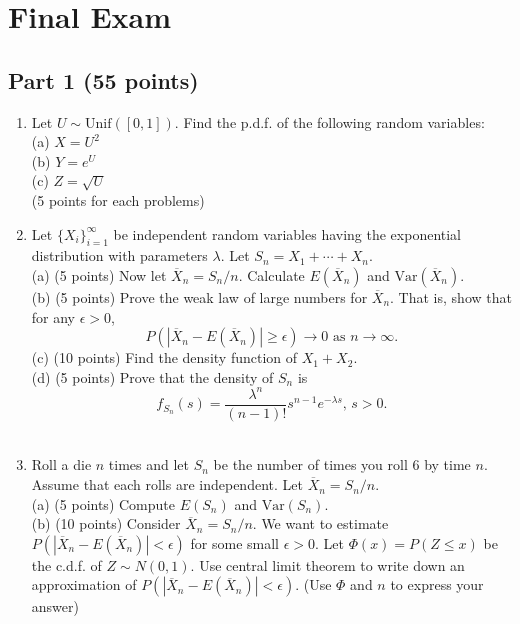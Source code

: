 \documentclass[14pt]{extarticle}
\begin{document}
\section*{Final Exam}
\subsection*{Part 1 (55 points)}
\begin{enumerate}
    \item Let $U\sim\text{Unif}([0,1])$. Find the p.d.f. of the following random variables:\\
    (a) $X=U^2$\\
    (b) $Y=e^U$\\
    (c) $Z=\sqrt{U}$\\
    (5 points for each problems)

    \item Let $\{X_i\}_{i=1}^\infty$ be independent random variables having the exponential distribution with parameters $\lambda$.
    Let $S_n=X_1+\cdots+X_n$.\\
    (a) (5 points) Now let $\overline{X}_n=S_n/n$. Calculate $E(\overline{X}_n)$ and $\text{Var}(\overline{X}_n)$.\\
    (b) (5 points) Prove the weak law of large numbers for $\overline{X}_n$. That is, show that for any $\epsilon>0$,
    \begin{equation*}
    P(|\overline{X}_n-E(\overline{X}_n)|\geq\epsilon)\rightarrow 0\text{ as }n\rightarrow\infty.
    \end{equation*}
    (c) (10 points) Find the density function of $X_1+X_2$.\\
    (d) (5 points) Prove that the density of $S_n$ is
    \begin{equation*}
    f_{S_n}(s)=\frac{\lambda^n}{(n-1)!}s^{n-1}e^{-\lambda s},\,s>0.
    \end{equation*}\\

    \item Roll a die $n$ times and let $S_n$ be the number of times you roll $6$ by time $n$. Assume that each rolls are independent. Let $\overline{X}_n=S_n/n$.\\
    (a) (5 points) Compute $E(S_n)$ and $\text{Var}(S_n)$.\\
    (b) (10 points) Consider $\overline{X}_n=S_n/n$. We want to estimate $P(|\overline{X}_n-E(\overline{X}_n)|<\epsilon)$ for some small $\epsilon>0$. Let $\Phi(x)=P(Z\leq x)$ be the c.d.f. of $Z\sim N(0,1)$. Use central limit theorem to write down an approximation of $P(|\overline{X}_n-E(\overline{X}_n)|<\epsilon)$. (Use $\Phi$ and $n$ to express your answer)

\end{enumerate}
\end{document}

